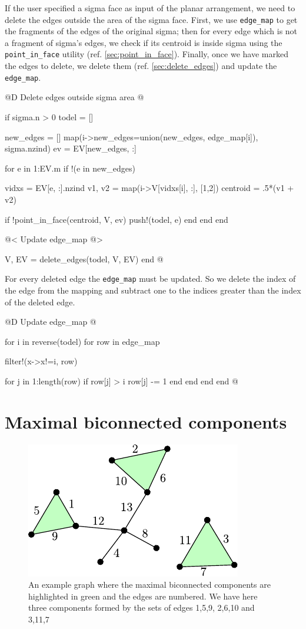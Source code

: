 If the user specified a sigma face as input of the planar arrangement,
we need to delete the edges outside the area of the sigma face. 
First, we use \texttt{edge\_map} to get the fragments of the edges of the original sigma;
then for every edge which is not a fragment of sigma's edges, we check if its centroid
is inside sigma using the \texttt{point\_in\_face} utility (ref. \ref{sec:point_in_face}).
Finally, once we have marked the edges to delete, we delete them (ref. \ref{sec:delete_edges}) and update the \texttt{edge\_map}.

@D Delete edges outside sigma area
@{if sigma.n > 0
    todel = []
    
    new_edges = []
    map(i->new_edges=union(new_edges, edge_map[i]), sigma.nzind)
    ev = EV[new_edges, :]

    for e in 1:EV.m
        if !(e in new_edges)

            vidxs = EV[e, :].nzind
            v1, v2 = map(i->V[vidxs[i], :], [1,2])
            centroid = .5*(v1 + v2)
            
            if !point_in_face(centroid, V, ev) 
                push!(todel, e)
            end
        end
    end

    @< Update edge\_map @>

    V, EV = delete_edges(todel, V, EV)
end
@}

\label{macro:update_edge_map}
For every deleted edge the \texttt{edge\_map} must be updated. 
So we delete the index of the edge from the mapping and subtract one 
to the indices greater than the index of the deleted edge.


@D Update edge\_map
@{for i in reverse(todel)
    for row in edge_map

        filter!(x->x!=i, row)

        for j in 1:length(row)
            if row[j] > i
                row[j] -= 1
            end
        end
    end
end
@}




\section{Maximal biconnected components}
\begin{figure}[h]
    \centering
    \includegraphics{./img/ch2-bicon.pdf}
    \caption{An example graph where the maximal biconnected 
    components are highlighted in green and the edges are numbered. 
    We have here three components formed by the sets of edges {1,5,9}, {2,6,10} and {3,11,7} }
    \label{img:bicon_comps}
\end{figure}
